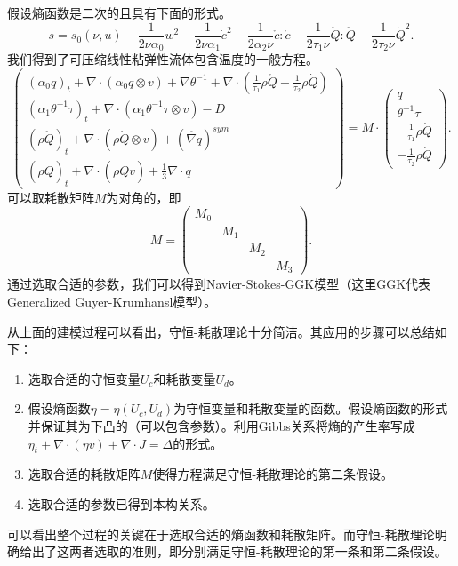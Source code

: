 \documentclass{article}
\begin{document}
假设熵函数是二次的且具有下面的形式。
	\begin{equation*}
		s = s_0(\nu,u)  - \frac{1}{2\nu \alpha_0} w^2 - \frac{1}{2\nu \alpha_1} \dot{c}^2- \frac{1}{2\alpha_2 \nu} \mathring{c}:\mathring{c} - \frac{1}{2 \tau_1 \nu} \mathring{Q}: \mathring{Q} - \frac{1}{2  \tau_2 \nu} \dot{Q}^2.
 	\end{equation*}  
我们得到了可压缩线性粘弹性流体包含温度的一般方程。
\begin{equation}\label{eq:CNSTgeneral}
   	\left( \begin{array}{c} 
			(\alpha_0 q)_t +  \nabla \cdot (\alpha_0  q \otimes v)  + \nabla \theta^{-1} + \nabla \cdot (\frac{1}{\tau_1} \rho \mathring{{Q}}+\frac{1}{\tau_2} \rho \dot{Q})\\
			(\alpha_1 \theta^{-1}\tau)_t +  \nabla \cdot (\alpha_1 \theta^{-1} \tau \otimes v)  - D \\
			(\rho \mathring{{Q}})_t + \nabla \cdot (\rho \mathring{Q} \otimes v)+(\mathring{\nabla {q}})^{sym} \\ (\rho \dot{Q})_t + \nabla \cdot (\rho \dot{Q} v)+\frac{1}{3} \nabla \cdot {q}
		\end{array} \right) = M \cdot
		\left( \begin{array}{c} 
			q \\ \theta^{-1} \tau \\ -\frac{1}{\tau_1} \rho \mathring{{Q}} \\ -\frac{1}{\tau_2} \rho \dot{{Q}}
		\end{array}\right).
\end{equation}
可以取耗散矩阵$M$为对角的，即
\begin{equation*}
	M = \left(\begin{array}{cccc}
	M_0 & & & \\
	& M_1 & & \\
	& & M_2 & \\
	& & & M_3 \end{array} \right).
\end{equation*}
通过选取合适的参数，我们可以得到Navier-Stokes-GGK模型（这里GGK代表Generalized Guyer-Krumhansl模型）。

从上面的建模过程可以看出，守恒-耗散理论十分简洁。其应用的步骤可以总结如下：
\begin{enumerate}
	\item 选取合适的守恒变量$U_c$和耗散变量$U_d$。
	\item 假设熵函数$\eta = \eta(U_c,U_d)$为守恒变量和耗散变量的函数。假设熵函数的形式并保证其为下凸的（可以包含参数）。利用Gibbs关系将熵的产生率写成$\eta_t+ \nabla \cdot (\eta v) + \nabla \cdot J = \Delta$的形式。
	\item 选取合适的耗散矩阵$M$使得方程满足守恒-耗散理论的第二条假设。
	\item 选取合适的参数已得到本构关系。
\end{enumerate}
可以看出整个过程的关键在于选取合适的熵函数和耗散矩阵。而守恒-耗散理论明确给出了这两者选取的准则，即分别满足守恒-耗散理论的第一条和第二条假设。
\end{document}
